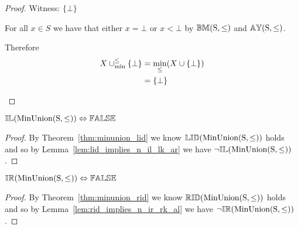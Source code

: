 \begin{proof}

\vspace{0.5em}

Witness: $\{\bot\}$
\begin{ind}
For all $x \in S$ we have that either $x = \bot$ or $x < \bot$ by ${\mathbb{BM}}(\mathrm{S,\leq})$ and ${\mathbb{AY}}(\mathrm{S,\leq})$.

\vspace{0.5em}

Therefore
\begin{align*}
X \mathbin{\cup_{\min}^{\leq}} \{\bot\} 	& = \min_\leq(X \cup \{\bot\}) \\
						& = \{\bot\}
\end{align*}
\end{ind}
\end{proof}





\begin{theorem} \label{thm:minunion_il}
${\mathbb{IL}}(\mathrm{MinUnion(S,\leq)}) \Leftrightarrow {\mathbb{FALSE}}$
\end{theorem}

\begin{proof}

\vspace{0.5em}

By Theorem~\ref{thm:minunion_lid} we know ${\mathbb{LID}}(\mathrm{MinUnion(S,\leq)})$ holds and so by Lemma~\ref{lem:lid_implies_n_il_lk_ar} we have $\neg {\mathbb{IL}}(\mathrm{MinUnion(S,\leq)})$.
\end{proof}






\begin{theorem} \label{thm:minunion_ir}
${\mathbb{IR}}(\mathrm{MinUnion(S,\leq)}) \Leftrightarrow {\mathbb{FALSE}}$
\end{theorem}

\begin{proof}

\vspace{0.5em}

By Theorem~\ref{thm:minunion_rid} we know ${\mathbb{RID}}(\mathrm{MinUnion(S,\leq)})$ holds and so by Lemma~\ref{lem:rid_implies_n_ir_rk_al} we have $\neg {\mathbb{IR}}(\mathrm{MinUnion(S,\leq)})$.
\end{proof}






